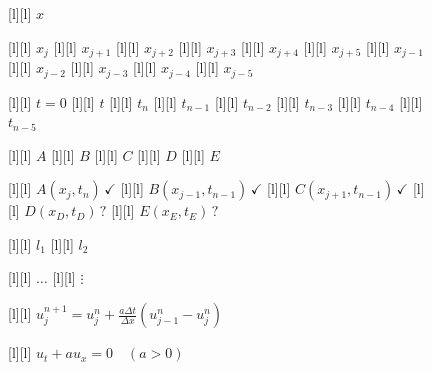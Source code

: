 \begin{figure}[ht]
	\centering
	\footnotesize

	[l] {$x$}

	[l] {$x_{j}$}
	[l] {$x_{j+1}$}
	[l] {$x_{j+2}$}
	[l] {$x_{j+3}$}
	[l] {$x_{j+4}$}
	[l] {$x_{j+5}$}
	[l] {$x_{j-1}$}
	[l] {$x_{j-2}$}
	[l] {$x_{j-3}$}
	[l] {$x_{j-4}$}
	[l] {$x_{j-5}$}


	[l] {$t=0$}
	[l] {$t$}
	[l] {$t_n$}
	[l] {$t_{n-1}$}
	[l] {$t_{n-2}$}
	[l] {$t_{n-3}$}
	[l] {$t_{n-4}$}
	[l] {$t_{n-5}$}

	[l] {$A$}
	[l] {$B$}
	[l] {$C$}
	[l] {$D$}
	[l] {$E$}

	[l] {$A(x_j,t_n)\,\checkmark$}
	[l] {$B(x_{j-1},t_{n-1})\,\checkmark$}
	[l] {$C(x_{j+1},t_{n-1})\,\checkmark$}
	[l] {$D(x_D,t_D)\,?$}
	[l] {$E(x_E,t_E)\, ?$}

	[l] {$l_1$}
	[l] {$l_2$}

	[l] {$\dots$}
	[l] {$\vdots$}

	[l] {$\displaystyle u_{j}^{n+1} 
	= u_{j}^{n} + \frac{a\Delta t}{\Delta x}\left(u_{j-1}^{n}-u_{j}^{n}\right)$}

	[l] {$\displaystyle u_{t} + au_{x} = 0 \quad (a>0)$}






\end{figure}
